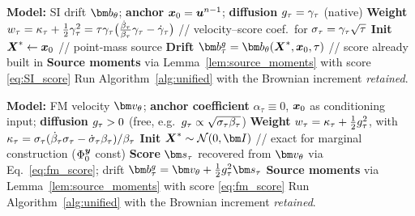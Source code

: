 \begin{algorithm}[ht]
\caption{Sampler 1 -- Stochastic interpolant SDE (native diffusion)}
\label{alg:si_sde}
\begin{algorithmic}[1]
\STATE \textbf{Model:} SI drift $\drift_\theta$; \textbf{anchor} $\boldsymbol{x}_0=\boldsymbol{u}^{n-1}$; \textbf{diffusion} $g_\tau=\gamma_\tau$ (native)
\STATE \textbf{Weight} $w_\tau = \kappa_\tau + \tfrac12\gamma_\tau^2 = \tau\gamma_\tau\big(\tfrac{\dot\beta_\tau}{\beta_\tau}\gamma_\tau-\dot\gamma_\tau\big)$ \hfill // velocity--score coef.\ for $\sigma_\tau=\gamma_\tau\sqrt\tau$
\STATE \textbf{Init} $\boldsymbol{X}^{*}\leftarrow\boldsymbol{x}_0$ \hfill // point-mass source
\STATE \textbf{Drift} $\drift^{\gdiff}_\tau=\drift_\theta(\bXstar,\bx_0,\tau)$ \hfill // score already built in
\STATE \textbf{Source moments} via Lemma~\ref{lem:source_moments} with score \eqref{eq:SI_score}
\STATE Run Algorithm~\ref{alg:unified} with the Brownian increment \emph{retained}.
\end{algorithmic}
\end{algorithm}

\begin{algorithm}[ht]
\caption{Sampler 2 -- Diffusion-model SDE (lifted diffusion)}
\label{alg:fm_sde}
\begin{algorithmic}[1]
\STATE \textbf{Model:} FM velocity $\fmvel_\theta$; \textbf{anchor coefficient} $\alpha_\tau\equiv0$, $\boldsymbol{x}_0$ as conditioning input; \textbf{diffusion} $g_\tau>0$ (free, e.g.\ $g_\tau\propto\sqrt{\sigma_\tau\beta_\tau}$)
\STATE \textbf{Weight} $w_\tau = \kappa_\tau + \tfrac12g_\tau^2$, with $\kappa_\tau=\sigma_\tau(\dot\beta_\tau\sigma_\tau-\dot{\sigma}_\tau\beta_\tau)/\beta_\tau$
\STATE \textbf{Init} $\bXstar\sim\mathcal{N}(0,\bI)$ \hfill // exact for marginal construction ($\Phi_0^{\boldsymbol{y}}$ const)
\STATE \textbf{Score} $\genscore_\tau$ recovered from $\fmvel_\theta$ via Eq.~\eqref{eq:fm_score}; drift $\drift^{\gdiff}_\tau=\fmvel_\theta+\tfrac12\gdiff_\tau^2\genscore_\tau$
\STATE \textbf{Source moments} via Lemma~\ref{lem:source_moments} with score \eqref{eq:fm_score}
\STATE Run Algorithm~\ref{alg:unified} with the Brownian increment \emph{retained}.
\end{algorithmic}
\end{algorithm}

